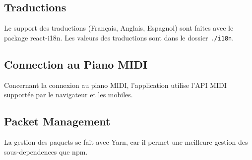 \subsection*{Traductions}
Le support des traductions (Français, Anglais, Espagnol) sont faites avec le package react-i18n. Les valeurs des traductions sont dans le dossier \verb|./i18n|.

\subsection*{Connection au Piano MIDI}
Concernant la connexion au piano MIDI, l’application utilise l’API MIDI supportée par le navigateur et les mobiles.

\subsection*{Packet Management}
La gestion des paquets se fait avec Yarn, car il permet une meilleure gestion des sous-dependences que npm.
